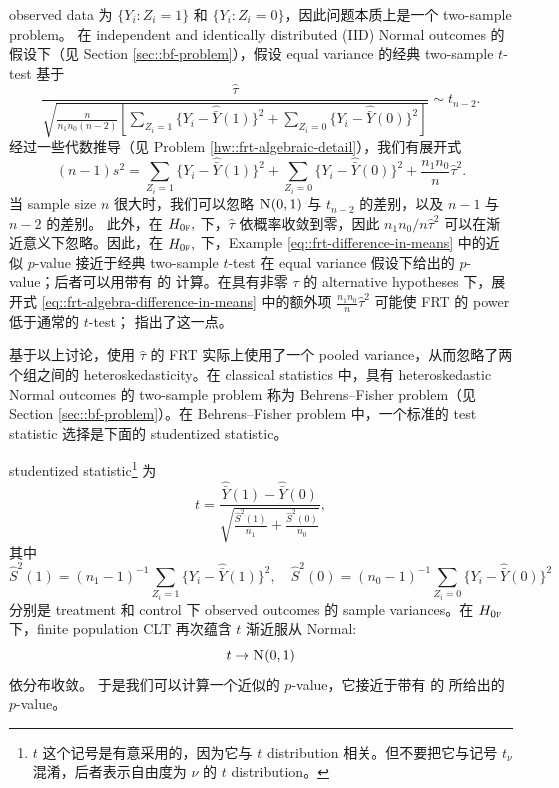 observed data 为 $\{  Y_i: Z_i = 1 \}$ 和 $\{ Y_i : Z_i = 0 \}$，因此问题本质上是一个 two-sample problem。
在 independent and identically distributed (IID) Normal outcomes 的假设下（见 Section \ref{sec::bf-problem}），假设 equal variance 的经典 two-sample $t$-test 基于
\begin{equation}\label{eq::two-sample-t-equalv}
\frac{  \hat{\tau}      }{  \sqrt{\frac{n}{n_1 n_0(n-2)}  \left[  \sum_{Z_i=1}  \{Y_i - \hat{\bar{Y}}(1)\}^2
+ \sum_{Z_i=0}  \{Y_i - \hat{\bar{Y}}(0)\}^2
    \right]  }    }   \sim t_{n-2}.
\end{equation}
经过一些代数推导（见 Problem \ref{hw::frt-algebraic-detail}），我们有展开式
\begin{equation}\label{eq::frt-algebra-difference-in-means}
(n-1)s^2 = \sum_{Z_i=1}  \{Y_i - \hat{\bar{Y}}(1)\}^2 + \sum_{Z_i=0}  \{Y_i - \hat{\bar{Y}}(0)\}^2
+ \frac{n_1 n_0}{n} \hat{\tau}^2 .
\end{equation}
当 sample size $n$ 很大时，我们可以忽略 $\N01$ 与 $t_{n-2}$ 的差别，以及 $n-1$ 与 $n-2$ 的差别。
此外，在 $H_{0\textsc{f}},$ 下，$\hat{\tau}$ 依概率收敛到零，因此 $ n_1 n_0 / n \hat{\tau}^2$ 可以在渐近意义下忽略。因此，在 $H_{0\textsc{f}},$ 下，Example \ref{eq::frt-difference-in-means} 中的近似 $p$-value 接近于经典 two-sample $t$-test 在 equal variance 假设下给出的 $p$-value；后者可以用带有  的  计算。在具有非零 $\tau$ 的 alternative hypotheses 下，展开式 \eqref{eq::frt-algebra-difference-in-means} 中的额外项 $\frac{n_1 n_0}{n} \hat{\tau}^2$ 可能使 FRT 的 power 低于通常的 $t$-test；\citet{Ding:2014} 指出了这一点。


基于以上讨论，使用 $\hat{\tau}$ 的 FRT 实际上使用了一个 pooled variance，从而忽略了两个组之间的 heteroskedasticity。在 classical statistics 中，具有 heteroskedastic Normal outcomes 的 two-sample problem 称为 Behrens--Fisher problem（见 Section \ref{sec::bf-problem}）。在 Behrens--Fisher problem 中，一个标准的 test statistic 选择是下面的 studentized statistic。



\begin{example}
\label{eg::studentized-statistic}
studentized statistic\footnote{$t$ 这个记号是有意采用的，因为它与 $t$ distribution 相关。但不要把它与记号 $t_\nu$ 混淆，后者表示自由度为 $\nu$ 的 $t$ distribution。} 为
$$
t = \frac{    \hat{\bar{Y}}(1)  -   \hat{\bar{Y}}(0)    }{  \sqrt{  \frac{  \hat{S}^2(1)  }{n_1}  + \frac{\hat{S}^2(0)}{n_0}  }   },
$$
其中
$$
\hat{S}^2(1) = (n_1 - 1)^{-1} \sum_{Z_i =1} \{ Y_i  -\hat{\bar{Y}}(1)   \}^2,\quad
\hat{S}^2(0) = (n_0 - 1)^{-1} \sum_{Z_i =0} \{ Y_i  -\hat{\bar{Y}}(0)   \}^2 
$$
分别是 treatment 和 control 下 observed outcomes 的 sample variances。在 $H_{0\textsc{f}}$ 下，finite population CLT 再次蕴含 $t$ 渐近服从 Normal:
$$
t \rightarrow \N01 
$$
依分布收敛。
于是我们可以计算一个近似的 $p$-value，它接近于带有  的  所给出的 $p$-value。
\end{example}



